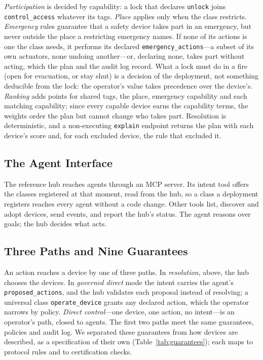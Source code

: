\documentclass[conference]{IEEEtran}
\newcommand{\code}[1]{\texttt{#1}}
\begin{document}
\emph{Participation} is decided by capability: a lock that declares \code{unlock} joins \code{control\_access} whatever its tags. \emph{Place} applies only when the class restricts. \emph{Emergency} rules guarantee that a safety device takes part in an emergency, but never outside the place a restricting emergency names. If none of its actions is one the class needs, it performs its declared \code{emergency\_actions}---a subset of its own actuators, none undoing another---or, declaring none, takes part without acting, which the plan and the audit log record. What a lock must do in a fire (open for evacuation, or stay shut) is a decision of the deployment, not something deducible from the lock: the operator's value takes precedence over the device's. \emph{Ranking} adds points for shared tags, the place, emergency capability and each matching capability; since every capable device earns the capability terms, the weights order the plan but cannot change who takes part. Resolution is deterministic, and a non-executing \code{explain} endpoint returns the plan with each device's score and, for each excluded device, the rule that excluded it.

\subsection{The Agent Interface}
The reference hub reaches agents through an MCP server. Its intent tool offers the classes registered at that moment, read from the hub, so a class a deployment registers reaches every agent without a code change. Other tools list, discover and adopt devices, send events, and report the hub's status. The agent reasons over goals; the hub decides what acts.

\subsection{Three Paths and Nine Guarantees}
An action reaches a device by one of three paths. In \emph{resolution}, above, the hub chooses the devices. In \emph{governed direct} mode the intent carries the agent's \code{proposed\_actions}, and the hub validates each proposal instead of resolving; a universal class \code{operate\_device} grants any declared action, which the operator narrows by policy. \emph{Direct control}---one device, one action, no intent---is an operator's path, closed to agents. The first two paths meet the same guarantees, policies and audit log. We separated these guarantees from how devices are described, as a specification of their own (Table~\ref{tab:guarantees}); each maps to protocol rules and to certification checks.
\end{document}
